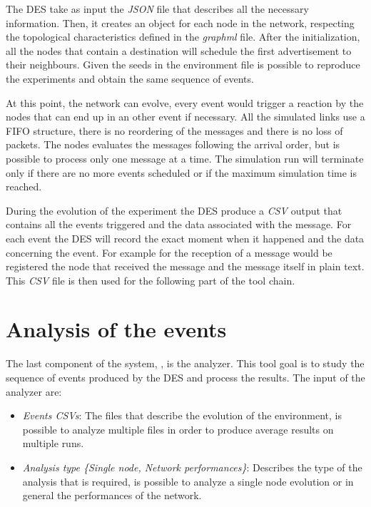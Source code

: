 The \ac{DES} take as input the \textit{JSON} file that describes all the necessary
information.
Then, it creates an object for each node in the network, respecting
the topological characteristics defined in the \textit{graphml} file.
After the initialization, all the nodes that contain a destination will schedule
the first advertisement to their neighbours.
Given the seeds in the environment file is possible to reproduce the experiments
and obtain the same sequence of events.

At this point, the network can evolve, every event would trigger a reaction by
the nodes that can end up in an other event if necessary.
All the simulated links use a \ac{FIFO} structure, there is no reordering of
the messages and there is no loss of packets.
The nodes evaluates the messages following the arrival order, but is possible
to process only one message at a time.
The simulation run will terminate only if there are no more events scheduled or
if the maximum simulation time is reached.

During the evolution of the experiment the \ac{DES} produce a \textit{CSV} output
that contains all the events triggered and the data associated with the message.
For each event the \ac{DES} will record the exact moment when it happened and
the data concerning the event.
For example for the reception of a message would be registered
the node that received the message and the message itself in plain text.
This \textit{CSV} file is then used for the following part of the tool chain.

\section{Analysis of the events}
\label{sec:exp_output_study}

The last component of the system, , is the analyzer.
This tool goal is to study the sequence of events produced by the \ac{DES} and
process the results.
The input of the analyzer are:
\begin{itemize}
		\item \textit{Events CSVs}: The files that describe the evolution of
				the environment, is possible to analyze multiple files in order
				to produce average results on multiple runs.
		\item \textit{Analysis type \{Single node, Network performances\}}:
				Describes the type of the analysis that is required, is possible
				to analyze a single node evolution or in general the performances
				of the network.
\end{itemize}

